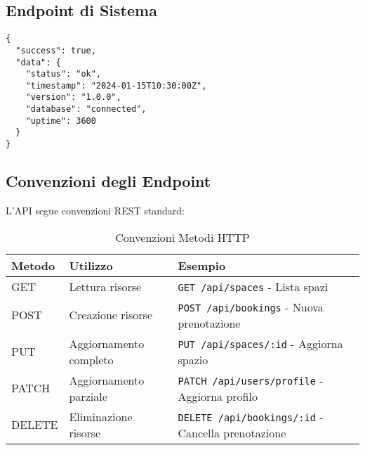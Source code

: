 \subsection{Endpoint di Sistema}


\begin{lstlisting}[caption=Risposta Health Check]
{
  "success": true,
  "data": {
    "status": "ok",
    "timestamp": "2024-01-15T10:30:00Z",
    "version": "1.0.0",
    "database": "connected",
    "uptime": 3600
  }
}
\end{lstlisting}



\subsection{Convenzioni degli Endpoint}
L'API segue convenzioni REST standard:

\begin{table}[H]
\centering
\begin{tabular}{@{}llp{8cm}@{}}
\toprule
\textbf{Metodo} & \textbf{Utilizzo} & \textbf{Esempio} \\
\midrule
GET & Lettura risorse & \texttt{GET /api/spaces} - Lista spazi \\
POST & Creazione risorse & \texttt{POST /api/bookings} - Nuova prenotazione \\
PUT & Aggiornamento completo & \texttt{PUT /api/spaces/:id} - Aggiorna spazio \\
PATCH & Aggiornamento parziale & \texttt{PATCH /api/users/profile} - Aggiorna profilo \\
DELETE & Eliminazione risorse & \texttt{DELETE /api/bookings/:id} - Cancella prenotazione \\
\bottomrule
\end{tabular}
\caption{Convenzioni Metodi HTTP}
\end{table}

